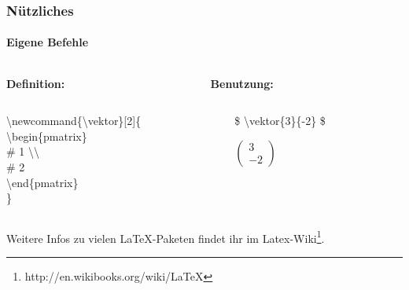 \begin{frame}
\frametitle{Nützliches}
\framesubtitle{Eigene Befehle}
\begin{columns}
\begin{column}{0.5\textwidth}
\textbf{Definition:}\\
\end{column}
\begin{column}{0.5\textwidth}
\textbf{Benutzung:}\\
\end{column}
\end{columns}
\bigskip
\begin{columns}
\begin{column}{0.5\textwidth}
\begin{ttfamily}{\normalsize
\color{nounibaredI}\textbackslash newcommand\color{black}\{\textbackslash vektor\}[2]\{\\
\color{unibablueI}\textbackslash begin\color{black}\{pmatrix\}\\
\color{unibayellowI}\# 1 \color{nounibaredI}\textbackslash \textbackslash\\
\color{unibayellowI} \# 2\\
\color{unibablueI}\textbackslash end\color{black}\{pmatrix\}\\
\}\\
}
\end{ttfamily}
\end{column}
\begin{column}{0.5\textwidth}
\begin{ttfamily}{\normalsize
\color{unibayellowI}\$ \color{nounibaredI}\textbackslash vektor\color{black}\{3\}\{-2\} \color{unibayellowI}\$ \\}
\end{ttfamily}
\medskip
$
\begin{pmatrix}
3 \\ -2
\end{pmatrix}
$
\end{column}
\end{columns}
\bigskip
Weitere Infos zu vielen \LaTeX -Paketen findet ihr im Latex-Wiki\footnote{http://en.wikibooks.org/wiki/LaTeX}.\\
\end{frame}

